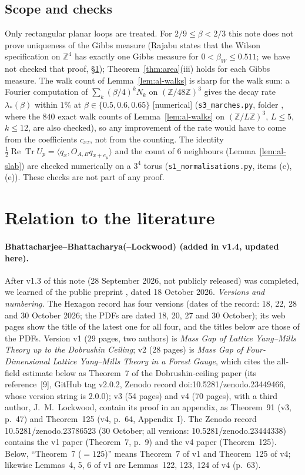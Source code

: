\documentclass[11pt,a4paper]{article}
\theoremstyle{remark}
\theoremstyle{definition}
\theoremstyle{plain}
\theoremstyle{remark}
\newcommand{\Z}{\mathbb{Z}}
\newcommand{\ReTr}{\operatorname{Re}\operatorname{Tr}}
\newcommand{\st}[1]{\textsf{[#1]}}
\begin{document}
\subsection{Scope and checks}\label{sec:areanum}

Only rectangular planar loops are treated. For $2/9\le\beta<2/3$ this note does not prove uniqueness of the Gibbs measure (Rajabu \cite[Theorem~9.1(i)]{Raj26b} states that the Wilson specification on $\Z^4$ has exactly one Gibbs measure for $0<\beta_W\le0.511$; we have not checked that proof, \S\ref{sec:lit}); Theorem~\ref{thm:area}(iii) holds for each Gibbs measure. The walk count of Lemma~\ref{lem:al-walks} is sharp for the walk sum: a Fourier computation of $\sum_k(\beta/4)^kN_k$ on $(\Z/48\Z)^3$ gives the decay rate $\lambda_*(\beta)$ within $1\%$ at $\beta\in\{0.5,0.6,0.65\}$ \st{numerical} (\texttt{s3\_marches.py}, folder , where the $840$ exact walk counts of Lemma~\ref{lem:al-walks} on $(\Z/L\Z)^3$, $L\le5$, $k\le12$, are also checked), so any improvement of the rate would have to come from the coefficients $c_{xz}$, not from the counting. The identity $\frac12\ReTr U_p=\langle q_x,O_{A,B}q_{x+e_\mu}\rangle$ and the count of $6$ neighbours (Lemma~\ref{lem:al-slab}) are checked numerically on a $3^4$ torus (\texttt{s1\_normalisations.py}, items (c), (e)). These checks are not part of any proof.

\section{Relation to the literature}\label{sec:lit}

\paragraph{Bhattacharjee--Bhattacharya(--Lockwood) \cite{BB26} (added in v1.4, updated here).} After v1.3 of this note
(28 September 2026, not publicly released) was completed, we learned of the public preprint \cite{BB26}, dated 18 October 2026.
\emph{Versions and numbering.} The Hexagon record has four versions (dates of the record: 18, 22, 28 and 30 October 2026; the PDFs are dated 18, 20, 27 and 30 October); its web pages show the title of the latest one for all four, and the titles below are those of the PDFs.
Version v1 (29 pages, two authors) is \emph{Mass Gap of Lattice Yang--Mills Theory up to the Dobrushin Ceiling}; v2 (28 pages) is
\emph{Mass Gap of Four-Dimensional Lattice Yang--Mills Theory in a Forest Gauge}, which cites the all-field estimate below as Theorem~7 of the Dobrushin-ceiling paper (its reference~[9], GitHub tag v2.0.2, Zenodo record doi:10.5281/zenodo.23449466, whose version string is 2.0.0); v3 (54 pages) and v4 (70 pages), with a third author, J.~M.~Lockwood,
contain its proof in an appendix, as Theorem~91 (v3, p.~47) and Theorem~125 (v4, p.~64, Appendix~I). The Zenodo record 10.5281/zenodo.23786523 (30 October; all versions: 10.5281/zenodo.23444338) contains the v1 paper
(Theorem~7, p.~9) and the v4 paper (Theorem~125). Below, ``Theorem~7 ($=125$)'' means Theorem~7 of v1 and Theorem~125 of v4; likewise Lemmas~4, 5, 6 of v1 are Lemmas~122, 123, 124 of v4 (p.~63).
\end{document}
